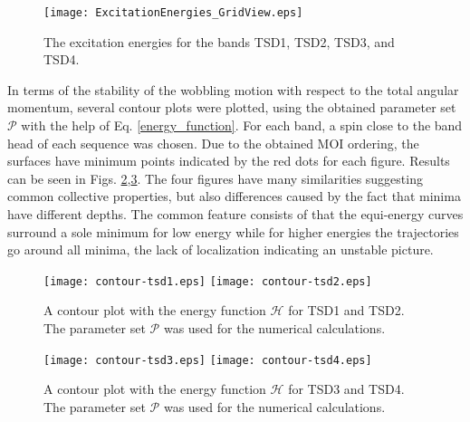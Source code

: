 \documentclass[twocolumn,article,amsmath,amssymb,floatfix,aps]{revtex4}
\begin{document}
\begin{figure}
    \centering
    \texttt{[image: ExcitationEnergies\_GridView.eps]}
    \caption{The excitation energies for the bands TSD1, TSD2, TSD3, and TSD4. }
    \label{tsd_bands}
\end{figure}

In terms of the stability of the wobbling motion with respect to the total angular momentum, several contour plots were plotted, using the obtained parameter set $\mathcal{P}$ with the help of Eq.  \ref{energy_function}.  For each band, a spin close to the band head of each sequence was chosen.  Due to the obtained MOI ordering, the surfaces have minimum points indicated by the red dots for each figure.  Results can be seen in Figs.  \ref{contour-tsd1},\ref{contour-tsd3}.  The four figures have many similarities suggesting common collective properties, but also differences caused by the fact that minima have different depths. The common feature consists of that the equi-energy curves surround a sole minimum for low energy while for higher energies the trajectories go around all minima, the lack of localization indicating an unstable picture. 

\begin{figure}
    \centering
    \texttt{[image: contour-tsd1.eps]}
    \texttt{[image: contour-tsd2.eps]}
    \caption{A contour plot with the energy function $\mathcal{H}$ for TSD1 and TSD2.  The parameter set $\mathcal{P}$ was used for the numerical calculations. }
    \label{contour-tsd1}
\end{figure}


\begin{figure}
    \centering
    \texttt{[image: contour-tsd3.eps]}
    \texttt{[image: contour-tsd4.eps]}
    \caption{A contour plot with the energy function $\mathcal{H}$ for TSD3 and TSD4.  The parameter set $\mathcal{P}$ was used for the numerical calculations. }
    \label{contour-tsd3}
\end{figure}
\end{document}
